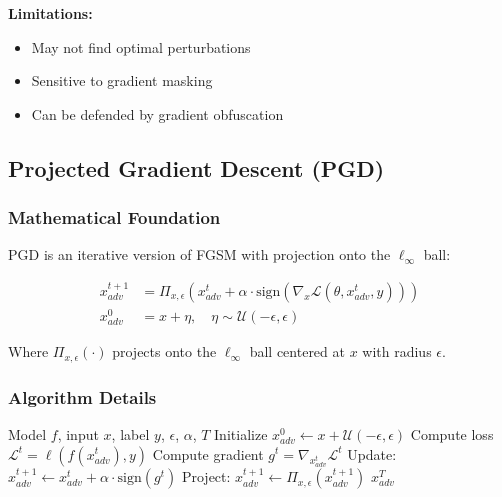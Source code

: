 \documentclass[conference]{IEEEtran}
\begin{document}
\textbf{Limitations:}
\begin{itemize}
  \item May not find optimal perturbations
  \item Sensitive to gradient masking
  \item Can be defended by gradient obfuscation
\end{itemize}

\subsection{Projected Gradient Descent (PGD)}
\label{sec:q4_pgd}

\subsubsection{Mathematical Foundation}
\label{sec:q4_pgd_math}

PGD is an iterative version of FGSM with projection onto the $\ell_\infty$ ball:

\begin{align}
x^{t+1}_{adv} &= \Pi_{x,\epsilon}(x^t_{adv} + \alpha \cdot \mathrm{sign}(\nabla_x \mathcal{L}(\theta, x^t_{adv}, y))) \\
x^0_{adv} &= x + \eta, \quad \eta \sim \mathcal{U}(-\epsilon, \epsilon)
\end{align}

Where $\Pi_{x,\epsilon}(\cdot)$ projects onto the $\ell_\infty$ ball centered at $x$ with radius $\epsilon$.

\subsubsection{Algorithm Details}
\label{sec:q4_pgd_algorithm}

\begin{algorithm}[H]
\caption{Projected Gradient Descent (PGD) Attack}
\begin{algorithmic}[1]
\Require Model $f$, input $x$, label $y$, $\epsilon$, $\alpha$, $T$
\State Initialize $x^0_{adv} \leftarrow x + \mathcal{U}(-\epsilon, \epsilon)$
  \State Compute loss $\mathcal{L}^t = \ell(f(x^t_{adv}), y)$
  \State Compute gradient $g^t = \nabla_{x^t_{adv}} \mathcal{L}^t$
  \State Update: $x^{t+1}_{adv} \leftarrow x^t_{adv} + \alpha \cdot \mathrm{sign}(g^t)$
  \State Project: $x^{t+1}_{adv} \leftarrow \Pi_{x,\epsilon}(x^{t+1}_{adv})$
\EndFor
\Ensure $x^T_{adv}$
\end{algorithmic}
\end{algorithm}
\end{document}
